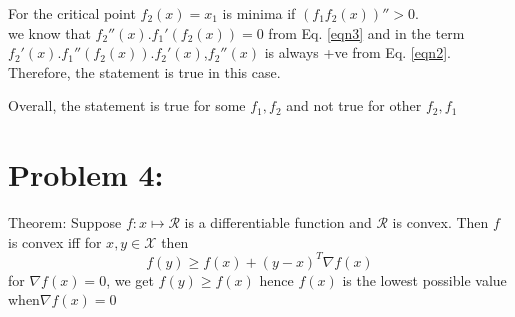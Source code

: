 \documentclass[5pt,a4paper]{article}
\begin{document}
	For the critical point  $f_2(x)=x_1$ is minima if $(f_1f_2(x))''>0$.\\
	we know that $f_2''(x).f_1'(f_2(x))=0$ from Eq. \ref{eqn3} and in the term $f_2'(x).f_1''(f_2(x)).f_2'(x) $,$f_2''(x)$ is  always +ve from Eq. \ref{eqn2}. Therefore, the statement is true in this case.
	
	Overall, the statement is true for some $f_1,f_2$ and not true for other $f_2,f_1$ 

\section*{Problem 4:}Theorem:
Suppose $f:x\mapsto\mathcal{R}$ is a differentiable function
and $\mathcal{R}$ is convex. Then $f$ is convex iff for $x, y \in \mathcal{X}$ then \\
\begin{equation}
	f(y)\geqslant f(x)+(y-x)^T \nabla f(x)
\end{equation}
for $ \nabla f(x)=0$, we get $f(y)\geqslant f(x)$ hence $f(x)$ is the lowest possible value when$ \nabla f(x)=0$
\end{document}
